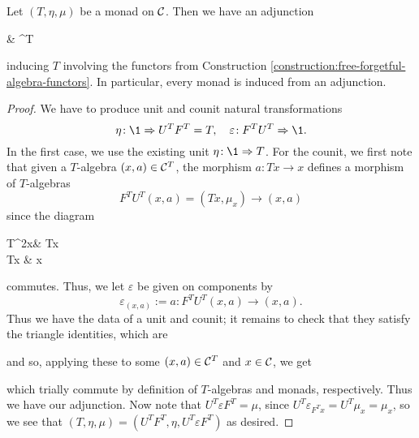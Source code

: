 \begin{proposition}
	Let \((T,\eta,\mu)\) be a monad on \(\mathcal{C}\). Then we have an adjunction
	\begin{diagram*}[column sep=large]
		\calC\ar[r,bend left,"F^T",""{name=A,below}] & \ar[l,bend left,"U^T",""{name=B,above}]\calC^T\ar[from=A,to=B,symbol=\dashv]
	\end{diagram*}
	inducing \(T\) involving the functors from Construction \ref{construction:free-forgetful-algebra-functors}. In particular, every monad is induced from an adjunction.
\end{proposition}
\begin{proof}
We have to produce unit and counit natural transformations
\[ \eta\!:\1\To U^TF^T = T,\quad \varepsilon\!:F^TU^T\To\1. \]
In the first case, we use the existing unit \(\eta\!:\1\To T\). For the counit, we first note that given a \(T\)-algebra \((x,a)\in\mathcal{C}^T\), the morphism \(a\!:Tx\to x\) defines
a morphism of \(T\)-algebras
\[ F^TU^T(x,a) = (Tx,\mu_x) \to (x,a) \]
since the diagram
\begin{diagram*}
	T^2x\ar[r,"Ta"]\ar[d,"\mu_x"'] & Tx\ar[d,"a"] \\
	Tx \ar[r,"a"] & x
\end{diagram*}
commutes. Thus, we let \(\varepsilon\) be given on components by
\[ \varepsilon_{(x,a)} := a\!: F^TU^T(x,a) \to (x,a). \]
Thus we have the data of a unit and counit; it remains to check that they satisfy the triangle identities, which are
\begin{center}
\quad
{}
\end{center}
and so, applying these to some \((x,a)\in\mathcal{C}^T\) and \(x\in\mathcal{C}\), we get
\begin{center}
\quad
{}
\end{center}
which trially commute by definition of \(T\)-algebras and monads, respectively. Thus we have our adjunction.
Now note that \(U^T\varepsilon F^T = \mu\), since \(U^T\varepsilon_{F^Tx} = U^T\mu_x = \mu_x\), so we see that
\((T,\eta,\mu) = (U^TF^T,\eta,U^T\varepsilon F^T)\) as desired.
\end{proof}
